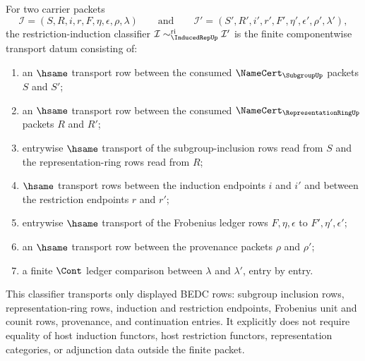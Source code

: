 \begin{definition}
\label{def:inducedrep-restriction-induction-classifier}
For two carrier packets
$$
\mathcal{I}=(S,R,i,r,F,\eta,\epsilon,\rho,\lambda)
\qquad\text{and}\qquad
\mathcal{I}'=(S',R',i',r',F',\eta',\epsilon',\rho',\lambda'),
$$
the restriction-induction classifier
$\mathcal{I}\sim_{\InducedRepUp}^{\mathrm{ri}}\mathcal{I}'$ is the finite
componentwise transport datum consisting of:
\begin{enumerate}
  \item an $\hsame$ transport row between the consumed
  $\NameCert_{\SubgroupUp}$ packets $S$ and $S'$;
  \item an $\hsame$ transport row between the consumed
  $\NameCert_{\RepresentationRingUp}$ packets $R$ and $R'$;
  \item entrywise $\hsame$ transport of the subgroup-inclusion rows read from
  $S$ and the representation-ring rows read from $R$;
  \item $\hsame$ transport rows between the induction endpoints $i$ and $i'$
  and between the restriction endpoints $r$ and $r'$;
  \item entrywise $\hsame$ transport of the Frobenius ledger rows
  $F,\eta,\epsilon$ to $F',\eta',\epsilon'$;
  \item an $\hsame$ transport row between the provenance packets $\rho$ and
  $\rho'$;
  \item a finite $\Cont$ ledger comparison between $\lambda$ and $\lambda'$,
  entry by entry.
\end{enumerate}
This classifier transports only displayed BEDC rows: subgroup inclusion rows,
representation-ring rows, induction and restriction endpoints, Frobenius
unit and counit rows, provenance, and continuation entries. It explicitly
does not require equality of host induction functors, host restriction
functors, representation categories, or adjunction data outside the finite
packet.
\end{definition}
